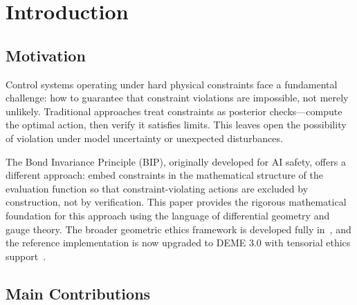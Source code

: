 \documentclass[11pt]{article}
\begin{document}
\tableofcontents

\newpage

\section{Introduction}

\subsection{Motivation}

Control systems operating under hard physical constraints face a fundamental challenge: how to
guarantee that constraint violations are impossible, not merely unlikely. Traditional approaches
treat constraints as posterior checks---compute the optimal action, then verify it satisfies limits.
This leaves open the possibility of violation under model uncertainty or unexpected disturbances.

The Bond Invariance Principle (BIP), originally developed for AI safety, offers a different
approach: embed constraints in the mathematical structure of the evaluation function so that
constraint-violating actions are excluded by construction, not by verification. This paper provides
the rigorous mathematical foundation for this approach using the language of differential
geometry and gauge theory. The broader geometric ethics framework is developed fully in~\cite{bond2026ge}, and the reference implementation is now upgraded to DEME 3.0 with tensorial ethics support~\cite{bond2026erisml}.

\subsection{Main Contributions}
\end{document}
